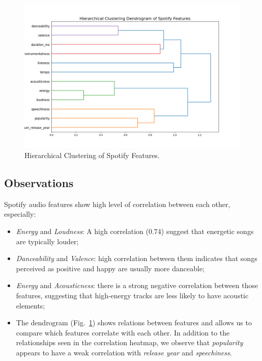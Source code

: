 \begin{center}
\begin{figure}[H]
  \centering
  \includegraphics[width=6in]{img/dendrogram_spotify_features.png}
  \caption{Hierarchical Clustering of Spotify Features.}
  \label{Figure:dendrogram_spotify_features}
\end{figure}
\end{center}

\subsection*{Observations}
Spotify audio features show high level of correlation between each other, especially:
\begin{itemize}
  \item \textit{Energy} and \textit{Loudness}: A high correlation (0.74) suggest
    that energetic songs are typically louder;
  \item \textit{Danceability} and \textit{Valence}: high correlation between
    them indicates that songs perceived as positive and happy are usually more
    danceable;
  \item \textit{Energy} and \textit{Acousticness}: there is a strong negative
    correlation between those features, suggesting that high-energy tracks are
    less likely to have acoustic elements;
  \item The dendrogram (Fig.~\ref{Figure:dendrogram_spotify_features}) shows relations
    between features and allows us to compare which features correlate with
    each other. In addition to the relationships seen in the correlation
    heatmap, we observe that \textit{popularity} appears to have a weak
    correlation with \textit{release year} and \textit{speechiness}.

\end{itemize}


